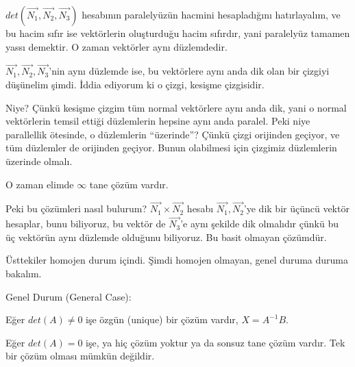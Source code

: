 \documentclass[12pt,fleqn]{article}\usepackage{../../common}
\begin{document}
$det(\vec{N_1},\vec{N_2},\vec{N_3})$ hesabının paralelyüzün hacmini
hesapladığını hatırlayalım, ve bu hacim sıfır ise vektörlerin oluşturduğu hacim
sıfırdır, yani paralelyüz tamamen yassı demektir. O zaman vektörler aynı
düzlemdedir.

$\vec{N_1},\vec{N_2},\vec{N_3}$'nin aynı düzlemde ise, bu vektörlere aynı
anda dik olan bir çizgiyi düşünelim şimdi. İddia ediyorum ki o çizgi,
kesişme çizgisidir.

Niye? Çünkü kesişme çizgim tüm normal vektörlere aynı anda dik, yani o
normal vektörlerin temsil ettiği düzlemlerin hepsine aynı anda
paralel. Peki niye parallellik ötesinde, o düzlemlerin ``üzerinde''? Çünkü
çizgi orijinden geçiyor, ve tüm düzlemler de orijinden geçiyor. Bunun
olabilmesi için çizgimiz düzlemlerin üzerinde olmalı.

O zaman elimde $\infty$ tane çözüm vardır. 

Peki bu çözümleri nasıl bulurum? $\vec{N_1} \times \vec{N_2}$ hesabı
$\vec{N_1},\vec{N_2}$'ye dik bir üçüncü vektör hesaplar, bunu biliyoruz, bu
vektör de $\vec{N_3}$'e aynı şekilde dik olmalıdır çünkü bu üç vektörün
aynı düzlemde olduğunu biliyoruz. Bu basit olmayan çözümdür.

Üsttekiler homojen durum içindi. Şimdi homojen olmayan, genel duruma duruma
bakalım.

Genel Durum (General Case):

Eğer $det(A) \ne 0$ işe özgün (unique) bir çözüm vardır, $X = A^{-1}B$. 

Eğer $det(A) = 0$ işe, ya hiç çözüm yoktur ya da sonsuz tane çözüm
vardır. Tek bir çözüm olması mümkün değildir. 
\end{document}
